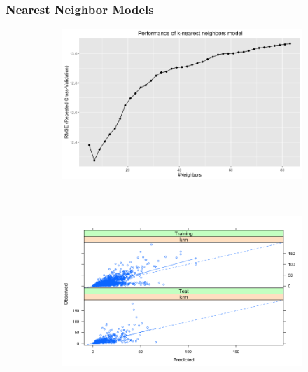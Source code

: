 \documentclass[letterpaper,12pt,titlepage,oneside,final]{report}
\begin{document}
            \subsubsection {Nearest Neighbor Models}
                \begin{figure}[!ht]
                \begin{subfigure}[t]{0.5\textwidth}
                    \centering
                    \includegraphics[width=1.2\textwidth]{knnresults}
                    \caption{}
                    \label{knnresults}
                \end{subfigure}%
                    ~ 
                \begin{subfigure}[t]{0.5\textwidth}
                    \centering
                    \includegraphics[width=1.2\textwidth]{knn_pred_obs}
                    \caption{}
                    \label{knn_pred_obs}
                \end{subfigure}
                \end{figure}
                \clearpage
\end{document}

